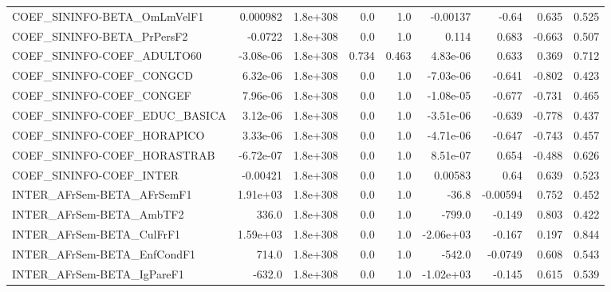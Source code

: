 \begin{tabular}{lrrrrrrrr}
COEF\_SININFO-BETA\_OmLmVelF1           &    0.000982 &     1.8e+308 &     0.0 &      1.0 &   -0.00137 &       -0.64 &        0.635 &         0.525 \\
COEF\_SININFO-BETA\_PrPersF2            &     -0.0722 &     1.8e+308 &     0.0 &      1.0 &      0.114 &       0.683 &       -0.663 &         0.507 \\
COEF\_SININFO-COEF\_ADULTO60            &   -3.08e-06 &     1.8e+308 &   0.734 &    0.463 &   4.83e-06 &       0.633 &        0.369 &         0.712 \\
COEF\_SININFO-COEF\_CONGCD              &    6.32e-06 &     1.8e+308 &     0.0 &      1.0 &  -7.03e-06 &      -0.641 &       -0.802 &         0.423 \\
COEF\_SININFO-COEF\_CONGEF              &    7.96e-06 &     1.8e+308 &     0.0 &      1.0 &  -1.08e-05 &      -0.677 &       -0.731 &         0.465 \\
COEF\_SININFO-COEF\_EDUC\_BASICA         &    3.12e-06 &     1.8e+308 &     0.0 &      1.0 &  -3.51e-06 &      -0.639 &       -0.778 &         0.437 \\
COEF\_SININFO-COEF\_HORAPICO            &    3.33e-06 &     1.8e+308 &     0.0 &      1.0 &  -4.71e-06 &      -0.647 &       -0.743 &         0.457 \\
COEF\_SININFO-COEF\_HORASTRAB           &   -6.72e-07 &     1.8e+308 &     0.0 &      1.0 &   8.51e-07 &       0.654 &       -0.488 &         0.626 \\
COEF\_SININFO-COEF\_INTER               &    -0.00421 &     1.8e+308 &     0.0 &      1.0 &    0.00583 &        0.64 &        0.639 &         0.523 \\
INTER\_AFrSem-BETA\_AFrSemF1            &    1.91e+03 &     1.8e+308 &     0.0 &      1.0 &      -36.8 &    -0.00594 &        0.752 &         0.452 \\
INTER\_AFrSem-BETA\_AmbTF2              &       336.0 &     1.8e+308 &     0.0 &      1.0 &     -799.0 &      -0.149 &        0.803 &         0.422 \\
INTER\_AFrSem-BETA\_CulFrF1             &    1.59e+03 &     1.8e+308 &     0.0 &      1.0 &  -2.06e+03 &      -0.167 &        0.197 &         0.844 \\
INTER\_AFrSem-BETA\_EnfCondF1           &       714.0 &     1.8e+308 &     0.0 &      1.0 &     -542.0 &     -0.0749 &        0.608 &         0.543 \\
INTER\_AFrSem-BETA\_IgPareF1            &      -632.0 &     1.8e+308 &     0.0 &      1.0 &  -1.02e+03 &      -0.145 &        0.615 &         0.539 \\

\end{tabular}
